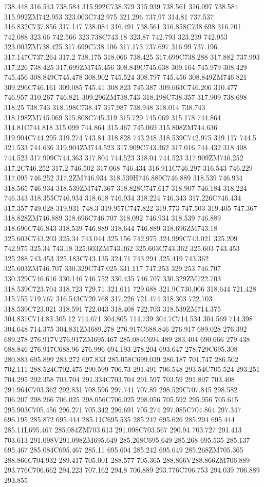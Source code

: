 738.448 316.543 738.584 315.992C738.379 315.939 738.561 316.097 738.584 315.992ZM742.953 323.003C742.975 321.296 737.97 314.81 737.537 316.832C737.856 317.147 738.084 316.491 738.561 316.858C738.698 316.701 742.088 323.66 742.566 323.738C743.18 323.87 742.793 323.239 742.953 323.003ZM738.425 317.699C738.106 317.173 737.697 316.99 737.196 317.147C737.264 317.2 738.175 318.066 738.425 317.699C738.288 317.882 737.993 317.226 738.425 317.699ZM745.456 308.849C745.638 309.164 745.979 308.429 745.456 308.849C745.478 308.902 745.524 308.797 745.456 308.849ZM746.821 309.296C746.161 309.085 745.41 308.823 745.387 309.663C746.206 310.477 746.957 310.267 746.821 309.296ZM738.743 318.198C738.357 317.909 738.698 318.25 738.743 318.198C738.47 317.987 738.948 318.014 738.743 318.198ZM745.069 315.808C745.319 315.729 745.069 315.178 744.864 314.81C744.818 315.099 744.864 315.467 745.069 315.808ZM744.636 319.904C744.295 319.274 743.84 318.828 743.248 318.539C742.975 319.117 744.5 321.533 744.636 319.904ZM744.523 317.909C743.362 317.016 744.432 318.408 744.523 317.909C744.363 317.804 744.523 318.04 744.523 317.909ZM746.252 317.2C746.252 317.2 746.502 317.068 746.434 316.911C746.297 316.543 746.229 317.095 746.252 317.2ZM746.934 318.539H746.889C746.889 318.539 746.934 318.565 746.934 318.539ZM747.367 318.828C747.617 318.907 746.184 318.224 746.343 318.355C746.934 318.618 746.934 318.224 746.343 317.226C746.434 317.357 749.028 319.931 748.3 319.957C747.822 319.773 747.503 319.405 747.367 318.828ZM746.889 318.696C746.707 318.092 746.934 318.539 746.889 318.696C746.843 318.539 746.889 318.644 746.889 318.696ZM743.18 325.603C743.203 325.34 743.044 325.156 742.975 324.999C743.021 325.209 742.975 325.34 743.18 325.603ZM743.362 325.603C743.362 325.603 743.453 325.288 743.453 325.183C743.135 324.71 743.294 325.419 743.362 325.603ZM746.707 330.329C747.025 331.117 747.253 329.253 746.707 330.329C746.616 330.146 746.752 330.435 746.707 330.329ZM722.703 318.539C723.704 318.723 729.71 321.611 729.688 321.9C730.006 318.644 721.428 315.755 719.767 316.543C720.768 317.226 721.474 318.303 722.703 318.539C723.021 318.591 722.043 318.408 722.703 318.539ZM714.375 304.831C714.83 305.12 714.671 304.805 714.739 304.7C714.534 304.569 714.398 304.648 714.375 304.831ZM689.278 276.917C688.846 276.917 689.028 276.392 689.278 276.917V276.917ZM695.467 285.084C694.489 283.404 690.666 279.438 688.846 276.917C688.96 276.996 694.193 278.204 693.647 278.729C695.308 280.883 695.899 283.272 697.833 285.058C699.039 286.187 701.747 286.502 702.111 288.524C702.475 290.599 706.73 291.491 706.548 293.54C705.524 293.251 704.295 292.358 703.704 291.334C703.704 291.597 703.59 291.807 703.408 291.964C703.362 292.831 708.596 297.741 707.89 298.529C707.845 298.582 706.207 298.266 706.025 298.056C706.025 298.056 705.592 295.956 705.615 295.903C705.456 296.271 705.342 296.691 705.274 297.085C704.864 297.347 696.195 285.872 695.444 285.11C695.535 285.242 695.626 285.294 695.444 285.11L695.467 285.084ZM703.613 291.098C703.567 290.94 703.727 291.413 703.613 291.098V291.098ZM695.649 285.268C695.649 285.268 695.535 285.137 695.467 285.084C695.467 285.11 695.604 285.242 695.649 285.268ZM705.365 288.866C704.932 289.417 705.001 288.577 705.365 288.866V288.866ZM706.889 293.776C706.662 294.223 707.162 294.8 706.889 293.776C706.753 294.039 706.889 293.855 